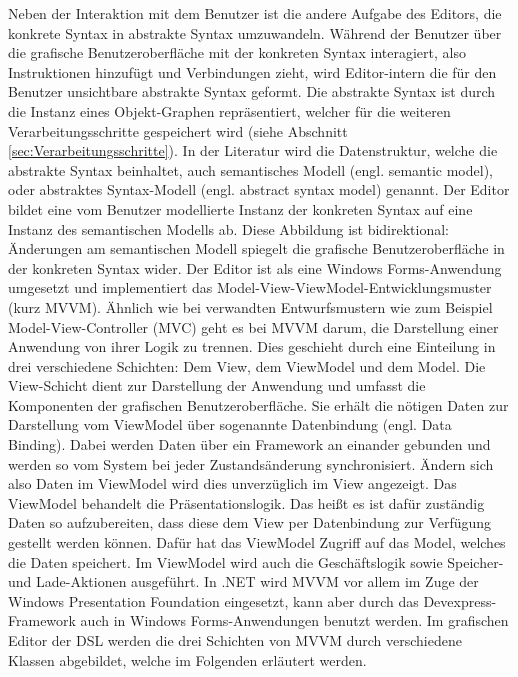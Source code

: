 \noindent Neben der Interaktion mit dem Benutzer ist die andere Aufgabe des Editors, die konkrete Syntax in abstrakte Syntax umzuwandeln. Während der Benutzer über die grafische Benutzeroberfläche mit der konkreten Syntax interagiert, also Instruktionen hinzufügt und Verbindungen zieht, wird Editor-intern die für den Benutzer unsichtbare abstrakte Syntax geformt. Die abstrakte Syntax ist durch die Instanz eines Objekt-Graphen repräsentiert, welcher für die weiteren Verarbeitungsschritte gespeichert wird (siehe Abschnitt \ref{sec:Verarbeitungsschritte}). In der Literatur wird die Datenstruktur, welche die abstrakte Syntax beinhaltet, auch semantisches Modell (engl. semantic model)\cite[S. 159ff]{Fowler:11}, oder abstraktes Syntax-Modell (engl. abstract syntax model)\cite[S. 78ff]{Kleppe:09} genannt. Der Editor bildet eine vom Benutzer modellierte Instanz der konkreten Syntax auf eine Instanz des semantischen Modells ab. Diese Abbildung ist bidirektional: Änderungen am semantischen Modell spiegelt die grafische Benutzeroberfläche in der konkreten Syntax wider. 
\newline
Der Editor ist als eine Windows Forms-Anwendung umgesetzt und implementiert das Model-View-ViewModel-Entwicklungsmuster (kurz MVVM). Ähnlich wie bei verwandten Entwurfsmustern wie zum Beispiel Model-View-Controller (MVC) geht es bei MVVM darum, die Darstellung einer Anwendung von ihrer Logik zu trennen. Dies geschieht durch eine Einteilung in drei verschiedene Schichten: Dem View, dem ViewModel und dem Model. Die View-Schicht dient zur Darstellung der Anwendung und umfasst die Komponenten der grafischen Benutzeroberfläche. Sie erhält die nötigen Daten zur Darstellung vom ViewModel über sogenannte Datenbindung (engl. Data Binding). Dabei werden Daten über ein Framework an einander gebunden und werden so vom System bei jeder Zustandsänderung synchronisiert. Ändern sich also Daten im ViewModel wird dies unverzüglich im View angezeigt. 
\newpage
\noindent Das ViewModel behandelt die Präsentationslogik. Das heißt es ist dafür zuständig Daten so aufzubereiten, dass diese dem View per Datenbindung zur Verfügung gestellt werden können. Dafür hat das ViewModel Zugriff auf das Model, welches die Daten speichert. Im ViewModel wird auch die Geschäftslogik sowie Speicher- und Lade-Aktionen ausgeführt. In .NET wird MVVM vor allem im Zuge der Windows Presentation Foundation eingesetzt, kann aber durch das Devexpress-Framework auch in Windows Forms-Anwendungen benutzt werden. 
\newline
Im grafischen Editor der DSL werden die drei Schichten von MVVM durch verschiedene Klassen abgebildet, welche im Folgenden erläutert werden.

